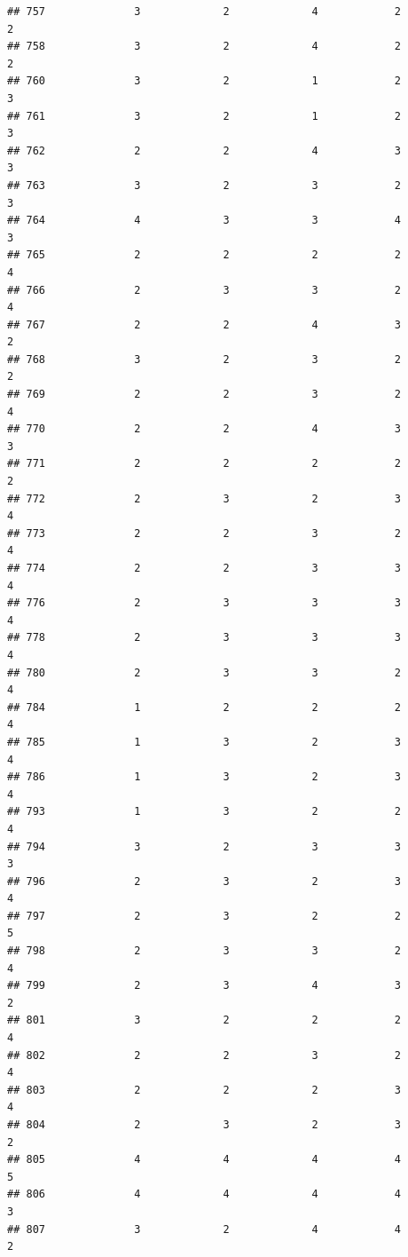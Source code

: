 \documentclass[
]{article}
\begin{document}
\begin{verbatim}
## 757              3             2             4            2          2
## 758              3             2             4            2          2
## 760              3             2             1            2          3
## 761              3             2             1            2          3
## 762              2             2             4            3          3
## 763              3             2             3            2          3
## 764              4             3             3            4          3
## 765              2             2             2            2          4
## 766              2             3             3            2          4
## 767              2             2             4            3          2
## 768              3             2             3            2          2
## 769              2             2             3            2          4
## 770              2             2             4            3          3
## 771              2             2             2            2          2
## 772              2             3             2            3          4
## 773              2             2             3            2          4
## 774              2             2             3            3          4
## 776              2             3             3            3          4
## 778              2             3             3            3          4
## 780              2             3             3            2          4
## 784              1             2             2            2          4
## 785              1             3             2            3          4
## 786              1             3             2            3          4
## 793              1             3             2            2          4
## 794              3             2             3            3          3
## 796              2             3             2            3          4
## 797              2             3             2            2          5
## 798              2             3             3            2          4
## 799              2             3             4            3          2
## 801              3             2             2            2          4
## 802              2             2             3            2          4
## 803              2             2             2            3          4
## 804              2             3             2            3          2
## 805              4             4             4            4          5
## 806              4             4             4            4          3
## 807              3             2             4            4          2

\end{verbatim}
\end{document}
